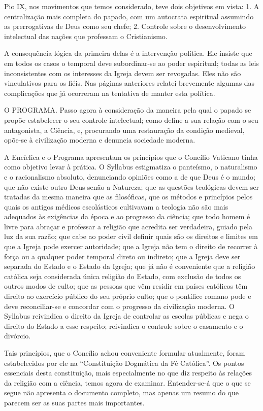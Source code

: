 \documentclass[11pt,a5paper,twoside,openany]{book}
\begin{document}
Pio IX, nos movimentos que temos considerado, teve dois objetivos em vista: 1. A centralização mais completa do papado, com um autocrata espiritual assumindo as prerrogativas de Deus como seu chefe; 2. Controle sobre o desenvolvimento intelectual das nações que professam o Cristianismo.

A consequência lógica da primeira delas é a intervenção política. Ele insiste que em todos os casos o temporal deve subordinar-se ao poder espiritual; todas as leis inconsistentes com os interesses da Igreja devem ser revogadas. Eles não são vinculativos para os fiéis. Nas páginas anteriores relatei brevemente algumas das complicações que já ocorreram na tentativa de manter esta política.

O PROGRAMA. Passo agora à consideração da maneira pela qual o papado se propõe estabelecer o seu controle intelectual; como define a sua relação com o seu antagonista, a Ciência, e, procurando uma restauração da condição medieval, opõe-se à civilização moderna e denuncia sociedade moderna.

A Encíclica e o Programa apresentam os princípios que o Concílio Vaticano tinha como objetivo levar à prática. O Syllabus estigmatiza o panteísmo, o naturalismo e o racionalismo absoluto, denunciando opiniões como a de que Deus é o mundo; que não existe outro Deus senão a Natureza; que as questões teológicas devem ser tratadas da mesma maneira que as filosóficas, que os métodos e princípios pelos quais os antigos médicos escolásticos cultivavam a teologia não são mais adequados às exigências da época e ao progresso da ciência; que todo homem é livre para abraçar e professar a religião que acredita ser verdadeira, guiado pela luz da sua razão; que cabe ao poder civil definir quais são os direitos e limites em que a Igreja pode exercer autoridade; que a Igreja não tem o direito de recorrer à força ou a qualquer poder temporal direto ou indireto; que a Igreja deve ser separada do Estado e o Estado da Igreja; que já não é conveniente que a religião católica seja considerada única religião do Estado, com exclusão de todos os outros modos de culto; que as pessoas que vêm residir em países católicos têm direito ao exercício público do seu próprio culto; que o pontífice romano pode e deve reconciliar-se e concordar com o progresso da civilização moderna. O Syllabus reivindica o direito da Igreja de controlar as escolas públicas e nega o direito do Estado a esse respeito; reivindica o controle sobre o casamento e o divórcio.

Tais princípios, que o Concílio achou conveniente formular atualmente, foram estabelecidos por ele na “Constituição Dogmática da Fé Católica”. Os pontos essenciais desta constituição, mais especialmente no que diz respeito às relações da religião com a ciência, temos agora de examinar. Entender-se-á que o que se segue não apresenta o documento completo, mas apenas um resumo do que parecem ser as suas partes mais importantes.
\end{document}
